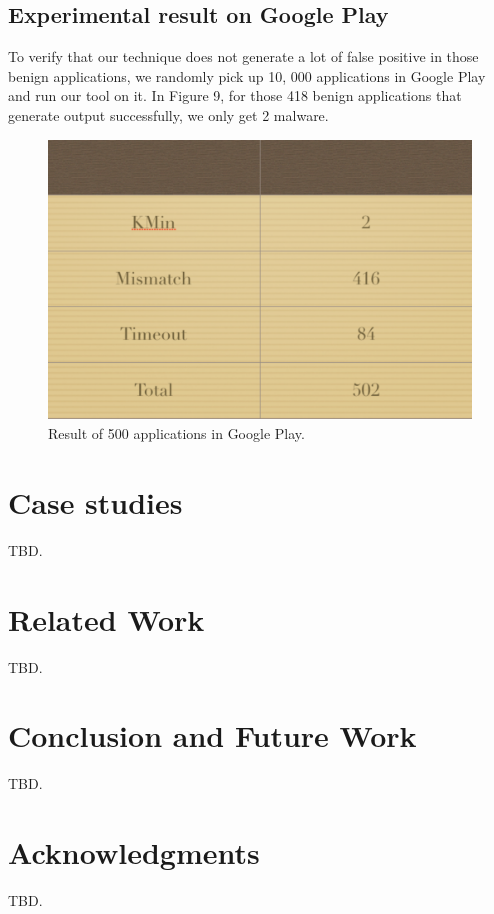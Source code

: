\documentclass{sig-alternate}
\begin{document}
\subsection{Experimental result on Google Play}
To verify that our technique does not generate a lot of false positive in those benign applications, we randomly pick up 10, 000 applications in Google Play and run our tool on it.
In Figure 9, for those 418 benign applications that generate output successfully, we only get 2 malware.
\begin{figure}
\begin{center}
  \includegraphics[scale=0.38]{img/googleplay}
\end{center}
\caption{Result of 500 applications in Google Play.}
\label{fig-ffsm}
\end{figure}

\section{Case studies}
TBD.

\section{Related Work}
TBD.

\section{Conclusion and Future Work}
TBD.

\section{Acknowledgments}
TBD.
\end{document}
